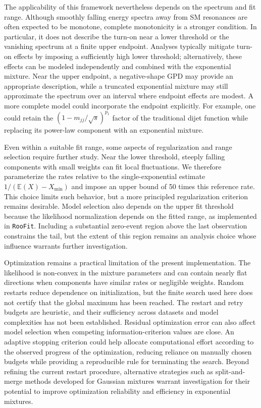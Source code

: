 \documentclass[a4paper,11pt]{article}
\begin{document}
The applicability of this framework nevertheless depends on the spectrum and fit range. Although smoothly falling energy spectra away from SM resonances are often expected to be monotone, complete monotonicity is a stronger condition. In particular, it does not describe the turn-on near a lower threshold or the vanishing spectrum at a finite upper endpoint. Analyses typically mitigate turn-on effects by imposing a sufficiently high lower threshold; alternatively, these effects can be modeled independently and combined with the exponential mixture. Near the upper endpoint, a negative-shape GPD may provide an appropriate description, while a truncated exponential mixture may still approximate the spectrum over an interval where endpoint effects are modest. A more complete model could incorporate the endpoint explicitly. For example, one could retain the $(1-m_{jj}/\sqrt{s})^{p_1}$ factor of the traditional dijet function while replacing its power-law component with an exponential mixture.

Even within a suitable fit range, some aspects of regularization and range selection require further study. Near the lower threshold, steeply falling components with small weights can fit local fluctuations. We therefore parameterize the rates relative to the single-exponential estimate $1/(\mathbb{E}(X)-X_{\min})$ and impose an upper bound of 50 times this reference rate. This choice limits such behavior, but a more principled regularization criterion remains desirable. Model selection also depends on the upper fit threshold because the likelihood normalization depends on the fitted range, as implemented in \texttt{RooFit}. Including a substantial zero-event region above the last observation constrains the tail, but the extent of this region remains an analysis choice whose influence warrants further investigation.

Optimization remains a practical limitation of the present implementation. The likelihood is non-convex in the mixture parameters and can contain nearly flat directions when components have similar rates or negligible weights. Random restarts reduce dependence on initialization, but the finite search used here does not certify that the global maximum has been reached. The restart and retry budgets are heuristic, and their sufficiency across datasets and model complexities has not been established. Residual optimization error can also affect model selection when competing information-criterion values are close. An adaptive stopping criterion could help allocate computational effort according to the observed progress of the optimization, reducing reliance on manually chosen budgets while providing a reproducible rule for terminating the search. Beyond refining the current restart procedure, alternative strategies such as split-and-merge methods developed for Gaussian mixtures \cite{split-and-merge} warrant investigation for their potential to improve optimization reliability and efficiency in exponential mixtures.
\end{document}
